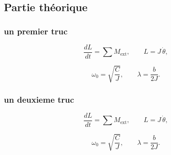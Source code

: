 \subsection{Partie théorique} \label{sec:theorie}

\subsubsection{un premier truc}

\begin{equation}
\frac{dL}{dt} = \sum M_{\mathrm{ext}},
\qquad L = J\,\dot{\theta},
\label{eq:TMC}
\end{equation}


\begin{equation}
\omega_0 = \sqrt{\frac{C}{J}},
\qquad
\lambda = \frac{b}{2J}.
\label{eq:lambda} %
\end{equation}

\subsubsection{un deuxieme truc}

\begin{equation}
\frac{dL}{dt} = \sum M_{\mathrm{ext}},
\qquad L = J\,\dot{\theta},
\label{eq:TMC}
\end{equation}


\begin{equation}
\omega_0 = \sqrt{\frac{C}{J}},
\qquad
\lambda = \frac{b}{2J}.
\label{eq:lambda} %
\end{equation}








